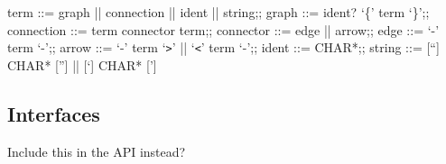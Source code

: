\begin{bnfgrammar}
	term ::= graph || connection || ident || string;;
	graph ::= ident? `\{' term `\}';;
	connection ::= term connector term;;
	connector ::= edge || arrow;;
	edge ::= `-' term `-';;
	arrow ::= `-' term `\texttt{>}' || `\texttt{<}' term `-';;
	ident ::= CHAR*;;
	string ::= [``] CHAR* [''] || [`] CHAR* [']
\end{bnfgrammar}

\subsection{Interfaces}
Include this in the API instead?

